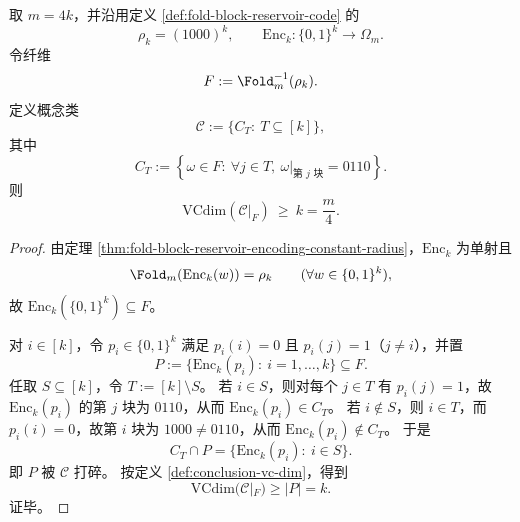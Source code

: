 \begin{theorem}\label{thm:killo-single-reservoir-fiber-linear-vc-lower-bound}
取 \(m=4k\)，并沿用定义 \ref{def:fold-block-reservoir-code} 的
\[
\rho_k=(1000)^k,\qquad
\mathrm{Enc}_k:\{0,1\}^k\to \Omega_m.
\]
令纤维
\[
F:=\Fold_m^{-1}(\rho_k).
\]
定义概念类
\[
\mathcal C:=\{C_T:\ T\subseteq [k]\},
\]
其中
\[
C_T:=\left\{\omega\in F:\ \forall j\in T,\ \omega|_{\text{第 }j\text{ 块}}=0110\right\}.
\]
则
\[
\mathrm{VCdim}(\mathcal C|_F)\ \ge\ k=\frac{m}{4}.
\]
\end{theorem}
\begin{proof}
由定理 \ref{thm:fold-block-reservoir-encoding-constant-radius}，\(\mathrm{Enc}_k\) 为单射且
\[
\Fold_m(\mathrm{Enc}_k(w))=\rho_k\qquad(\forall w\in\{0,1\}^k),
\]
故 \(\mathrm{Enc}_k(\{0,1\}^k)\subseteq F\)。

对 \(i\in[k]\)，令 \(p_i\in\{0,1\}^k\) 满足 \(p_i(i)=0\) 且 \(p_i(j)=1\)（\(j\neq i\)），并置
\[
P:=\{\mathrm{Enc}_k(p_i):\ i=1,\dots,k\}\subseteq F.
\]
任取 \(S\subseteq[k]\)，令 \(T:=[k]\setminus S\)。
若 \(i\in S\)，则对每个 \(j\in T\) 有 \(p_i(j)=1\)，故 \(\mathrm{Enc}_k(p_i)\) 的第 \(j\) 块为 \(0110\)，从而 \(\mathrm{Enc}_k(p_i)\in C_T\)。
若 \(i\notin S\)，则 \(i\in T\)，而 \(p_i(i)=0\)，故第 \(i\) 块为 \(1000\neq 0110\)，从而 \(\mathrm{Enc}_k(p_i)\notin C_T\)。
于是
\[
C_T\cap P=\{\mathrm{Enc}_k(p_i):\ i\in S\}.
\]
即 \(P\) 被 \(\mathcal C\) 打碎。
按定义 \ref{def:conclusion-vc-dim}，得到
\[
\mathrm{VCdim}(\mathcal C|_F)\ge |P|=k.
\]
证毕。
\end{proof}

\endinput
